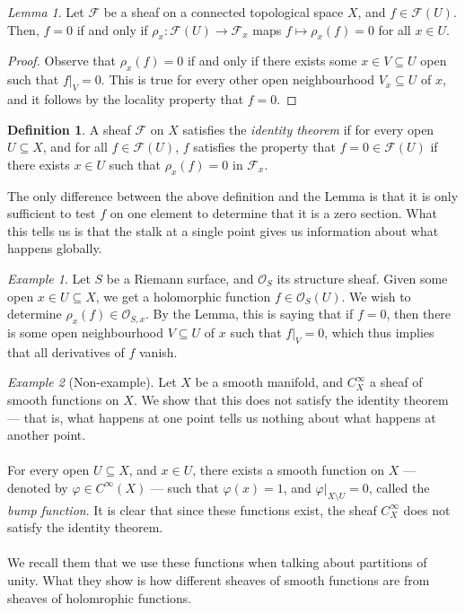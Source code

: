 \documentclass[a4paper]{report}
\theoremstyle{definition}
\newtheorem{definition}{Definition}
\theoremstyle{remark}
\theoremstyle{proposition}
\theoremstyle{conjecture}
\theoremstyle{lemma}
\newtheorem{lemma}{Lemma}
\theoremstyle{corollary}
\theoremstyle{exercise}
\theoremstyle{example}
\newtheorem{example}{Example}
\newcommand{\mcal}{\mathcal}
\begin{document}
\begin{lemma}
    Let $\mcal{F}$ be a sheaf on a connected topological space $X$, and 
    $f \in \mcal{F}(U)$.
    Then, $f = 0$ if and only if $\rho_x : \mcal{F}(U) \to \mcal{F}_x$ 
    maps $f\mapsto \rho_x(f) = 0$ for all $x \in U$.
\end{lemma}

\begin{proof}
    Observe that $\rho_x(f) = 0$ if and only if there exists 
    some $x \in V \subseteq U$ open such that $f\vert_V = 0$.
    This is true for every other open neighbourhood $V_x \subseteq U$ of $x$, 
    and it follows by the locality property that $f=0$.
\end{proof}

\begin{definition}
    A sheaf $\mcal{F}$ on $X$ satisfies the \emph{identity theorem} if 
    for every open $U\subseteq X$, and for all $f \in \mcal{F}(U)$, 
    $f$ satisfies the property that 
    $f=0\in\mcal{F}(U)$ if there exists $x \in U$ such that 
    $\rho_x(f) = 0$ in $\mcal{F}_x$.
\end{definition}

The only difference between the above definition and the Lemma is that 
it is only sufficient to test $f$ on one element to determine that it is 
a zero section. What this tells us is that the stalk at a single point 
gives us information about what happens globally.

\begin{example}
    Let $S$ be a Riemann surface, and $\mcal{O}_S$ its structure sheaf.
    Given some open $x\in U\subseteq X$, we get a holomorphic function
    $f \in \mcal{O}_S(U)$. We wish to determine $\rho_x(f) \in \mcal{O}_{S,x}$.
    By the Lemma, this is saying that if $f = 0$, then 
    there is some open neighbourhood $V\subseteq U$ of $x$ such that 
    $f\vert_V = 0$, which thus implies that all derivatives of $f$ vanish.
\end{example}

\begin{example}[Non-example]
    Let $X$ be a smooth manifold, and $C^\infty_X$ a sheaf of 
    smooth functions on $X$. We show that this does not satisfy the 
    identity theorem --- that is, what happens at one point tells us nothing
    about what happens at another point.\\\\
    For every open $U\subseteq X$, and $x \in U$, there exists a smooth
    function on $X$ --- denoted by $\varphi \in C^\infty(X)$ --- such that 
    $\varphi(x) = 1$, and $\varphi\vert_{X\setminus U} = 0$, called the 
    \emph{bump function}. It is clear that since these functions exist,
    the sheaf $C^\infty_X$ does not satisfy the identity theorem.\\\\
    We recall them that we use these functions when talking about partitions
    of unity. What they show is how different sheaves of smooth functions
    are from sheaves of holomrophic functions.
\end{example}
\end{document}
